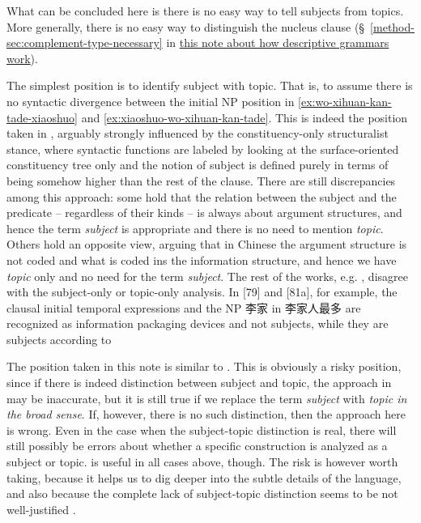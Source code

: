 \documentclass[UTF8, a4paper, oneside, scheme=plain]{ctexart}
\newcommand*{\citesec}[1]{\S~{#1}}
\newcommand*{\term}[1]{\emph{#1}}
\newcommand{\method}{\href{../methodology/glossing.pdf}{this note about how descriptive grammars work}}
\begin{document}
What can be concluded here is there is no easy way to tell subjects from topics.
More generally, there is no easy way to distinguish the nucleus clause 
(\citesec{\ref{method-sec:complement-type-necessary}} in \method).

The simplest position is to identify subject with topic.
That is, to assume there is no syntactic divergence 
between the initial NP position in  
\eqref{ex:wo-xihuan-kan-tade-xiaoshuo} and \eqref{ex:xiaoshuo-wo-xihuan-kan-tade}.
This is indeed the position taken in \citep[7.1.3]{zhudexigrammar},
arguably strongly influenced by the constituency-only structuralist stance,
where syntactic functions are labeled by looking at the surface-oriented constituency tree only
and the notion of subject is defined purely in terms of being somehow higher than the rest of the clause.
There are still discrepancies among this approach:
some hold that the relation between the subject and the predicate 
-- regardless of their kinds -- 
is always about argument structures,
and hence the term \term{subject} is appropriate and there is no need to mention \term{topic}.
Others hold an opposite view,
arguing that in Chinese the argument structure is not coded 
and what is coded ins the information structure,
and hence we have \term{topic} only and no need for the term \term{subject}.
The rest of the works, e.g. \citet{huang2016reference}, disagree
with the subject-only or topic-only analysis.
In \citet[\citesec{2.6}]{huang2016reference} [79] and [81a],
for example, 
the clausal initial temporal expressions and the NP 李家 in 李家人最多 
are recognized as information packaging devices and not subjects,
while they are subjects according to \citet[\citesec{7.2, 7.9.1}]{zhudexigrammar}

The position taken in this note is similar to \citet{huang2016reference}.
This is obviously a risky position,
since if there is indeed distinction between subject and topic, 
the approach in \citet{zhudexigrammar} may be inaccurate,
but it is still true if we replace the term \term{subject} with \term{topic in the broad sense}.
If, however, there is no such distinction,
then the approach here is wrong.
Even in the case when the subject-topic distinction is real,
there will still possibly be errors about 
whether a specific construction is
analyzed as a subject or topic.
\citet{zhudexigrammar} is useful in all cases above, though.
The risk is however worth taking, 
because it helps us to dig deeper into the subtle details of the language,
and also because the complete lack of subject-topic distinction 
seems to be not well-justified \citep{sih2000topic}.
\end{document}
